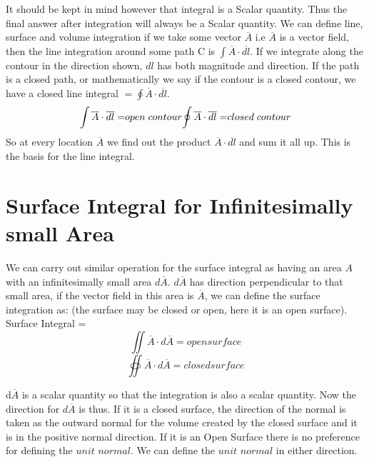 It should be kept in mind however that integral is a Scalar quantity. Thus the final answer after integration will always be a Scalar quantity. We can define line, surface and volume integration if we take some vector $\overline{A}$ i.e $\overline{A}$ is a vector field, then the line integration around some path C is ${\displaystyle \int  \overline{A} \cdot \overline{dl}}$. If we integrate along the contour in the direction shown, $dl$ has both magnitude and direction. If the path is a closed path, or mathematically we say if the contour is a closed contour, we have a closed line integral $= {\displaystyle \oint  \overline{A} \cdot \overline{dl}}$.
\begin{equation}
{\displaystyle \int  \overline{A} \cdot \overline{dl} = }open\; contour \newline  {\displaystyle \oint  \overline{A} \cdot \overline{dl}= }closed\; contour
\end{equation}
So at every location $\overline{A}$ we find out the product $\overline{A} \cdot \overline{dl}$ and sum it all up. This is the basis for the line integral.
\section{Surface Integral for Infinitesimally small Area}
We can carry out similar operation for the surface integral as having an area $A$ with an infinitesimally small area $d\overline{A}$. $d\overline{A}$ has direction perpendicular to that small area, if the vector field in this area is $\overline{A}$, we can define the surface integration as:
 (the surface may be closed or open, here it is an open surface).\newline
 Surface Integral =
 \begin{equation*}
  {   \iint \overline{A} \cdot d\overline{A}= open surface }
  \end{equation*}
   \begin{equation}
   \oiint \overline{A} \cdot d\overline{A} = closed surface
    \end{equation}
    
d$\overline{A}$ is a scalar quantity so that the integration is also a scalar quantity. Now the direction for $d\overline{A}$ is thus. If it is a closed surface, the direction of the normal is taken as the outward normal for the volume created by the closed surface and it is in the positive normal direction.\newline
If it is an Open Surface there is no preference for defining the $unit$ $normal$. We can define the $unit$ $normal$ in either direction.

